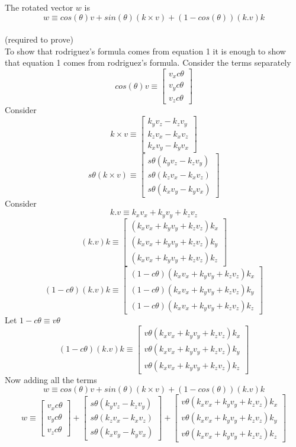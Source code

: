 \documentclass[12pt]{article}
\newcommand{\rtp}{{\\ \color{blue} \hspace*{\fill}(required to prove)} \\}
\begin{document}
The rotated vector $w$ is
\[
  w \equiv cos(\theta) v + sin(\theta) (k \times v) + (1 - cos(\theta)) (k.v) k
\]
\rtp
To show that rodriguez’s formula comes from equation 1 it is enough to show that equation 1 comes from rodriguez’s formula.
Consider the terms separately
\[
  cos(\theta) v \equiv
  \begin{bmatrix} v_x c\theta \\ v_y c\theta \\ v_z c\theta \end{bmatrix}
\]
Consider
\[
  k \times v \equiv
  \begin{bmatrix} k_y v_z - k_z v_y \\ k_z v_x - k_x v_z \\ k_x v_y - k_y v_x \end{bmatrix}
\]
\[
  s\theta (k \times v) \equiv
  \begin{bmatrix} s\theta (k_y v_z - k_z v_y) \\ s\theta (k_z v_x - k_x v_z) \\ s\theta (k_x v_y - k_y v_x) \end{bmatrix}
\]
Consider
\[
  k.v \equiv
  k_x v_x + k_y v_y + k_z v_z
\]
\[
  (k.v) k \equiv
  \begin{bmatrix} (k_x v_x + k_y v_y + k_z v_z) k_x \\ (k_x v_x + k_y v_y + k_z v_z) k_y \\ (k_x v_x + k_y v_y + k_z v_z) k_z \end{bmatrix}
\]
\[
  (1 - c\theta) (k.v) k \equiv
  \begin{bmatrix} (1 - c\theta) (k_x v_x + k_y v_y + k_z v_z) k_x \\ (1 - c\theta) (k_x v_x + k_y v_y + k_z v_z) k_y \\ (1 - c\theta) (k_x v_x + k_y v_y + k_z v_z) k_z \end{bmatrix}
\]
Let $1 - c\theta \equiv v\theta$
\[
  (1 - c\theta) (k.v) k \equiv
  \begin{bmatrix} v\theta (k_x v_x + k_y v_y + k_z v_z) k_x \\ v\theta (k_x v_x + k_y v_y + k_z v_z) k_y \\ v\theta (k_x v_x + k_y v_y + k_z v_z) k_z \end{bmatrix}
\]
Now adding all the terms
\[
  w
  \equiv
  cos(\theta) v + sin(\theta) (k \times v) + (1 - cos(\theta)) (k.v) k
\]
\[
  w
  \equiv
  \begin{bmatrix} v_x c\theta \\ v_y c\theta \\ v_z c\theta \end{bmatrix}
  +
  \begin{bmatrix} s\theta (k_y v_z - k_z v_y) \\ s\theta (k_z v_x - k_x v_z) \\ s\theta (k_x v_y - k_y v_x) \end{bmatrix}
  +
  \begin{bmatrix} v\theta (k_x v_x + k_y v_y + k_z v_z) k_x \\ v\theta (k_x v_x + k_y v_y + k_z v_z) k_y \\ v\theta (k_x v_x + k_y v_y + k_z v_z) k_z \end{bmatrix}
\]
\end{document}
